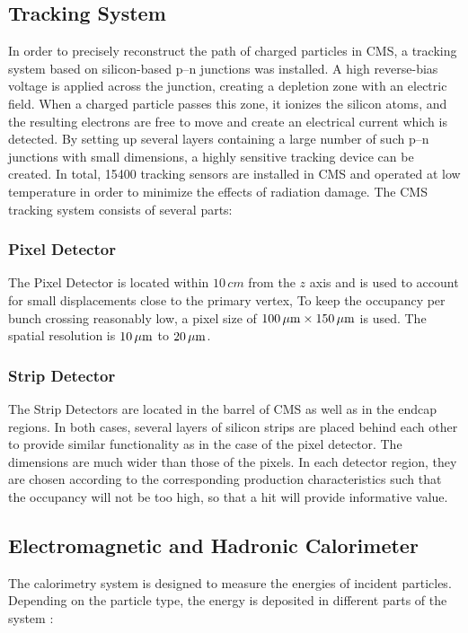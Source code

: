 \subsection{Tracking System}
In order to precisely reconstruct the path of charged particles in CMS, a tracking system based on silicon-based p--n junctions was installed. A high reverse-bias voltage is applied across the junction, creating a depletion zone with an electric field. When a charged particle passes this zone, it ionizes the silicon atoms, and the resulting electrons are free to move and create an electrical current which is detected. By setting up several layers containing a large number of such p--n junctions with small dimensions, a highly sensitive tracking device can be created. In total, 15400 tracking sensors are installed in CMS and operated at low temperature in order to minimize the effects of radiation damage. The CMS tracking system consists of several parts:

\subsubsection*{Pixel Detector}
The Pixel Detector is located within $10\,\unit{cm}$ from the $z$ axis and is used to account for small displacements close to the primary vertex, To keep the occupancy per bunch crossing reasonably low, a pixel size of $100\,\mu\text{m} \times 150\,\mu\text{m}$ is used. The spatial resolution is $10\,\mu\text{m}$ to $20\,\mu\text{m}$.

\subsubsection*{Strip Detector}
	The Strip Detectors are located in the barrel of CMS as well as in the endcap regions. In both cases, several layers of silicon strips are placed behind each other to provide similar functionality as in the case of the pixel detector. The dimensions are much wider than those of the pixels. In each detector region, they are chosen according to the corresponding production characteristics such that the occupancy will not be too high, so that a hit will provide informative value.

\subsection{Electromagnetic and Hadronic Calorimeter}
The calorimetry system is designed to measure the energies of incident particles. Depending on the particle type, the energy is deposited in different parts of the system \cite{EvaHalkiadakis}:

